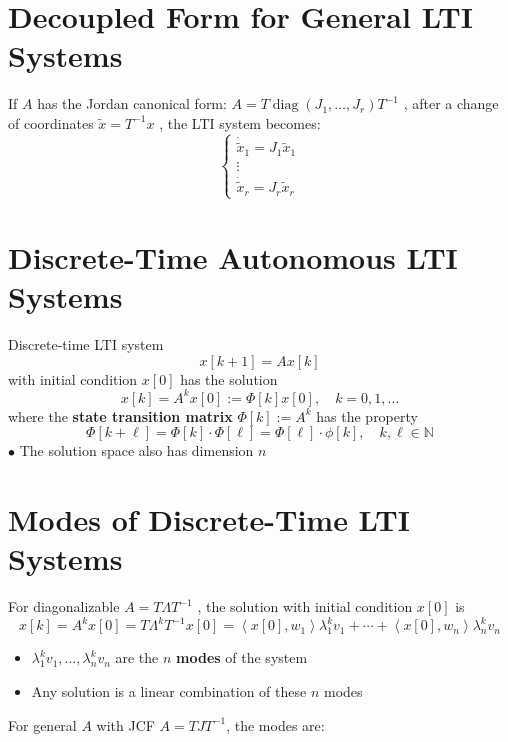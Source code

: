 \documentclass[10pt,a4paper,oneside]{article}
\begin{document}
\section{Decoupled Form for General LTI Systems}
If $A$ has the Jordan canonical form: $A=T \operatorname{diag}\left(J_{1}, \ldots, J_{r}\right) T^{-1}$ , after a change of coordinates $\tilde{x}=T^{-1} x$ , the LTI system becomes:
\[
\left\{\begin{array}{l}{\dot{\tilde{x}}_{1}=J_{1} \tilde{x}_{1}} \\ {\vdots} \\ {\dot{\tilde{x}}_{r}=J_{r} \tilde{x}_{r}}\end{array}\right.
\]
\section{Discrete-Time Autonomous LTI Systems}
Discrete-time LTI system
\[
x[k+1]=A x[k]
\]
with initial condition $x[0]$ has the solution
\[
x[k]=A^kx[0]:=\Phi[k] x[0], \quad k=0,1, \ldots
\]
where the {\bfseries state transition matrix} $\Phi[k] :=A^{k}$ has the property
\[
\Phi[k+\ell]=\Phi[k] \cdot \Phi[\ell]=\Phi[\ell] \cdot \phi[k], \quad k, \ell \in \mathbb{N}
\]
$\bullet$ The solution space also has dimension $n$
\section{Modes of Discrete-Time LTI Systems}
For diagonalizable $A=T \Lambda T^{-1}$ , the solution with initial condition $x[0]$ is
\[
x[k]=A^{k} x[0]=T \Lambda^{k} T^{-1} x[0]=\left\langle x[0], w_{1}\right\rangle \lambda_{1}^{k} v_{1}+\cdots+\left\langle x[0], w_{n}\right\rangle \lambda_{n}^{k} v_{n}
\]
\begin{itemize}
\item $\lambda_{1}^{k} v_{1}, \ldots, \lambda_{n}^{k} v_{n}$ are the $n$ {\bfseries modes} of the system
\item Any solution is a linear combination of these $n$ modes
\end{itemize}
For general $A$ with JCF $A=TJT^{-1}$, the modes are:
\end{document}
